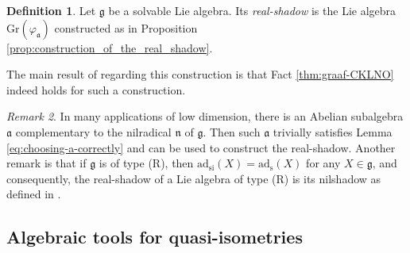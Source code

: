 \documentclass[a4paper,12pt]{amsart}
\newcommand{\pp}{\mathrm}
\newcommand{\ad}{\mathrm{ad}}
\theoremstyle{plain}
\theoremstyle{definition}
\newtheorem{maar}{Definition}[section]
\theoremstyle{plain}
\theoremstyle{remark}
\newtheorem{huom}[maar]{Remark}
\begin{document}
\begin{maar}
	Let \( \mathfrak{g} \) be a solvable Lie algebra. Its \emph{real-shadow} is the Lie algebra \( \pp{Gr}(\varphi_\mathfrak{a}) \) constructed as in Proposition \ref{prop:construction_of_the_real_shadow}.
\end{maar}

The main result of \cite{avain:CKLNO} regarding this construction is that Fact \ref{thm:graaf-CKLNO} indeed holds for such a construction.

\begin{huom} \label{rmk:nilshadow_is_real}
	In many applications of low dimension, there is an Abelian subalgebra \( \mathfrak{a} \) complementary to the nilradical \( \mathfrak{n} \) of \( \mathfrak{g} \). Then such \( \mathfrak{a} \) trivially satisfies Lemma \ref{eq:choosing-a-correctly} and can be used to construct the real-shadow. Another remark is that if \( \mathfrak{g} \) is of type (R), then \( \ad_\pp{si}(X) = \ad_\pp{s}(X) \) for any \( X \in \mathfrak{g} \), and consequently, the real-shadow of a Lie algebra of type (R) is its nilshadow as defined in \cite{avain:DER03}.
\end{huom}






\subsection{Algebraic tools for quasi-isometries}

\label{sec:algebraic_tools_for_QI}
\end{document}
